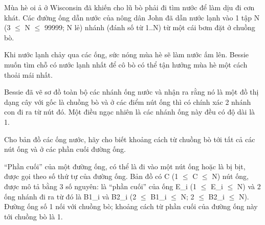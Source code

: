 Mùa hè oi ả ở Wisconsin đã khiến cho lũ bò phải đi tìm nước để làm dịu đi cơn khát. Các đường ống dẫn nước của nông dân John đã dẫn nước lạnh vào 1 tập N (3  $\le$  N  $\le$  99999; N lẻ) nhánh (đánh số từ 1..N) từ một cái bơm đặt ở chuồng bò.  

   Khi nước lạnh chảy qua các ống, sức nóng mùa hè sẽ làm nước ấm lên.  Bessie muốn tìm chỗ có nước lạnh nhất để cô bò có thể tận hưởng mùa  hè một cách thoải mái nhất.  

   Bessie đã vẽ sơ đồ toàn bộ các nhánh ống nước và nhận ra rằng nó là  một đồ thị dạng cây với gốc là chuồng bò và ở các điểm nút ống thì  có chính xác 2 nhánh con đi ra từ nút đó. Một điều ngạc nhiên là  các nhánh ống này đều có độ dài là 1.  

   Cho bản đồ các ống nước, hãy cho biết khoảng cách từ chuồng bò  tới tất cả các nút ống và ở các phần cuối đường ống.  

   “Phần cuối” của một đường ống, có thể là đi vào một nút ống hoặc  là bị bịt, được gọi theo số thứ tự của đường ống. Bản đồ có C  (1  $\le$  C  $\le$  N) nút ống, được mô tả bằng 3 số nguyên: là “phần cuối”  của ống E\_i (1  $\le$  E\_i  $\le$  N) và 2 ống nhánh đi ra từ đó là  B1\_i và B2\_i (2  $\le$  B1\_i  $\le$  N; 2  $\le$  B2\_i  $\le$  N). Đường ống số 1 nối  với chuồng bò; khoảng cách từ phần cuối của đường ống này  tới chuồng bò là 1.  

\